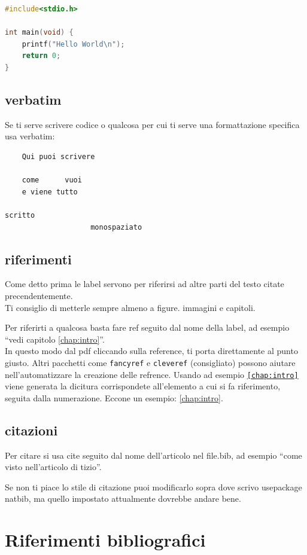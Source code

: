 \documentclass[12pt,a4paper,twoside]{book}
\begin{document}
\begin{lstlisting}[language=c]
#include<stdio.h>

int main(void) {
    printf("Hello World\n");
    return 0;
}
\end{lstlisting}

\section{verbatim}
Se ti serve scrivere codice o qualcosa per cui ti serve una formattazione specifica usa verbatim:
\begin{verbatim}
    Qui puoi scrivere

    come      vuoi
    e viene tutto

scritto
                    monospaziato
\end{verbatim}
\section{riferimenti}
Come detto prima le label servono per riferirsi ad altre parti del testo citate precendentemente.\\
Ti consiglio di metterle sempre almeno a figure. immagini e capitoli.

Per riferirti a qualcosa basta fare ref seguito dal nome della label, ad esempio ``vedi capitolo \ref{chap:intro}''.\\In questo modo dal pdf cliccando sulla reference, ti porta direttamente al punto giusto.
Altri pacchetti come \texttt{fancyref} e \texttt{cleveref} (consigliato) possono aiutare nell'automatizzare la creazione delle refrence. Usando ad esempio \texttt{\cref{chap:intro}} viene generata la dicitura corrispondete all'elemento a cui si fa riferimento, seguita dalla numerazione. Eccone un esempio: \cref{chap:intro}.
\section{citazioni}
Per citare si usa cite seguito dal nome dell'articolo nel file.bib, ad esempio ``come visto nell'articolo di tizio\cite{greenwade93}''.

Se non ti piace lo stile di citazione puoi modificarlo sopra dove scrivo usepackage natbib, ma quello impostato attualmente dovrebbe andare bene.



\renewcommand{\bibsection}{}
\chapter*{Riferimenti bibliografici}

\newpage
\end{document}
